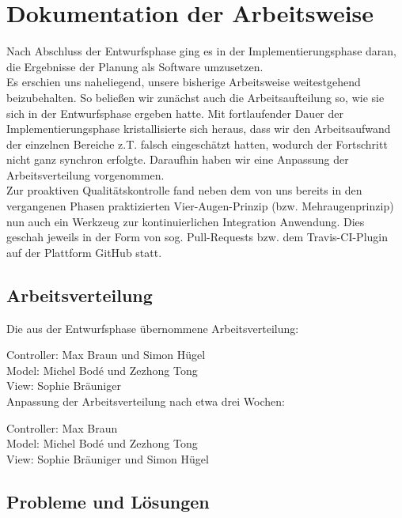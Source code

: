 \section{Dokumentation der Arbeitsweise}

Nach Abschluss der Entwurfsphase ging es in der Implementierungsphase daran, die Ergebnisse der Planung als Software umzusetzen.\\
Es erschien uns naheliegend, unsere bisherige Arbeitsweise weitestgehend beizubehalten. So beließen wir zunächst auch die Arbeitsaufteilung so, wie sie sich in der Entwurfsphase ergeben hatte. Mit fortlaufender Dauer der Implementierungsphase kristallisierte sich heraus, dass wir den Arbeitsaufwand der einzelnen Bereiche z.T. falsch eingeschätzt hatten, wodurch der Fortschritt nicht ganz synchron erfolgte. Daraufhin haben wir eine Anpassung der Arbeitsverteilung vorgenommen.\\
Zur proaktiven Qualitätskontrolle fand neben dem von uns bereits in den vergangenen Phasen praktizierten Vier-Augen-Prinzip (bzw. Mehraugenprinzip) nun auch ein Werkzeug zur kontinuierlichen Integration Anwendung. Dies geschah jeweils in der Form von sog. Pull-Requests bzw. dem Travis-CI-Plugin auf der Plattform GitHub statt.

\subsection{Arbeitsverteilung}

Die aus der Entwurfsphase übernommene Arbeitsverteilung:

Controller: Max Braun und Simon Hügel\\
Model: Michel Bodé und Zezhong Tong\\
View: Sophie Bräuniger\\

Anpassung der Arbeitsverteilung nach etwa drei Wochen:

Controller: Max Braun\\
Model: Michel Bodé und Zezhong Tong\\
View: Sophie Bräuniger und Simon Hügel\\

\subsection{Probleme und Lösungen}

